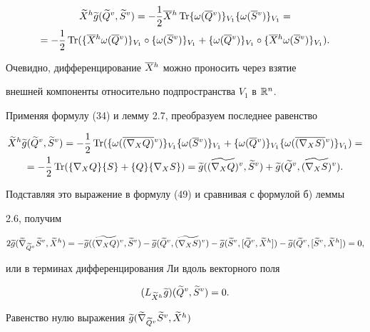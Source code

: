 \begin{pf}
\begin{multline*}
\grh{X}\g{g}(\grv{Q},\grv{S})=-\1\olh{X}\Tr\{\w(\olv{Q})\}_{V_1}\{\w


(\olv{S})\}_{V_1}=\\


=-\1\Tr(\{\olh{X}\w(\olv{Q})\}_{V_1}\circ


\{\w(\olv{S})\}_{V_1}+\{\w(\olv{Q})\}_{V_1}\circ


\{\olh{X}\w(\olv{S})\}_{V_1}).


\end{multline*}


Очевидно, дифференцирование $\overline {X}{}^h$ можно проносить через взятие


внешней компоненты относительно подпространства $V_1$ в $\Bbb R^n$.


Применяя формулу (34) и лемму 2.7, преобразуем последнее равенство


\begin{multline*}


\grh{X}\g{g}(\grv{Q},\grv{S})=-\1\Tr(\{\w(\olv{(\n{X}{Q})})\}


_{V_1}\{\w(\olv{S})\}_{V_1}+\{\w(\olv{Q})\}_{V_1}\{\w(\olv{(\n


{X}{S})})\}_{V_1})=\\


=-\1\Tr(\{\n{X}{Q}\}\{S\}+\{Q\}\{\n{X}{S}\})=\g{g}(\grv{(\n


{X}{Q})},\grv{S})+\g{g}(\grv{Q},\grv{(\n{X}{S})}).


\end{multline*}


Подставляя это выражение в формулу (49) и сравнивая с формулой б) леммы


2.6, получим


$$


2\g{g}(\grn{\tvQ}{\grv{S}},\grh{X})=-\g{g}(\grv{(\n{X}{Q})},\grv


{S})-\g{g}(\grv{Q},\grv{(\n{X}{S})})-


\g{g}(\grv{S},[\grv{Q},\grh{X}])-\g{g}(\grv{Q},[\grv{S},\grh{X}])=0,


$$


или в терминах дифференцирования Ли вдоль векторного поля


\begin{equation}




(L_{\thX}\g{g})(\grv{Q},\grv{S})=0.


\end{equation}


Равенство нулю выражения $\widetilde {g}(\widetilde\nabla_{\widetilde Q{}^v}{\widetilde {S}{}^v},\widetilde {X}{}^h)$



\end{pf}

